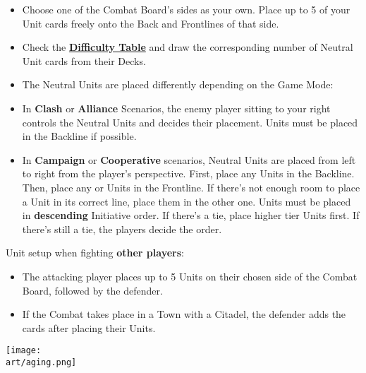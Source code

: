 \begin{multicols}{2}
\begin{itemize}
  \item Choose one of the Combat Board's sides as your own.
    Place up to 5 of your Unit cards freely onto the Back and Frontlines of that side.
  \item Check the \hyperlink{Difficulty Table}{\textbf{Difficulty Table}} \iftoggle{printable}{(on the back cover)}{} and draw the corresponding number of Neutral Unit cards from their Decks.
  \item The Neutral Units are placed differently depending on the Game Mode:
  \item In \textbf{Clash} or \textbf{Alliance} Scenarios, the enemy player sitting to your right controls the Neutral Units and decides their placement.
     Units must be placed in the Backline if possible.
  \item In \textbf{Campaign} or \textbf{Cooperative} scenarios, Neutral Units are placed from left to right from the player's perspective.
First, place any  Units in the Backline.
Then, place any  or  Units in the Frontline.
If there's not enough room to place a Unit in its correct line, place them in the other one.
Units must be placed in \textbf{descending} Initiative order.
If there's a tie, place higher tier Units first.
If there's still a tie, the players decide the order.
\end{itemize}
Unit setup when fighting \textbf{other players}:
\begin{itemize}[wide]
  \item The attacking player places up to 5 Units on their chosen side of the Combat Board, followed by the defender.
  \item If the Combat takes place in a Town with a Citadel, the defender adds the  cards after placing their Units.
\end{itemize}
\vfill
\begin{center}
  \texttt{[image: \\art/aging.png]}
\end{center}
\vfill
{}


\end{multicols}
